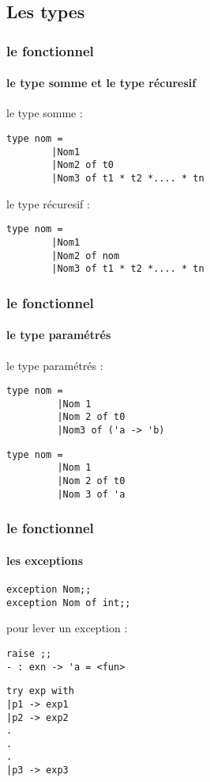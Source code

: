       \subsection{Les types}
\begin{frame}[fragile]
	\frametitle{le fonctionnel}
	\framesubtitle{le type somme et le type récuresif}
	le type somme :
	\begin{lstlisting}
type nom =
        |Nom1 
        |Nom2 of t0 
        |Nom3 of t1 * t2 *.... * tn 
	\end{lstlisting}
	le type récuresif :
	\begin{lstlisting}
type nom =
        |Nom1
        |Nom2 of nom
        |Nom3 of t1 * t2 *.... * tn
         \end{lstlisting}
\end{frame}

\begin{frame}[fragile]
  \frametitle{le fonctionnel}
  \framesubtitle{le type paramétrés}
  le type paramétrés :
  \begin{lstlisting}
type nom =
         |Nom 1
         |Nom 2 of t0
         |Nom3 of ('a -> 'b)
  \end{lstlisting}
  \begin{lstlisting}
type nom = 
         |Nom 1 
         |Nom 2 of t0
         |Nom 3 of 'a 
  \end{lstlisting}
\end{frame}

\begin{frame}[fragile]
  \frametitle{le fonctionnel}
  \framesubtitle{les exceptions}
  \begin{lstlisting}
exception Nom;;
exception Nom of int;;
  \end{lstlisting}
pour lever un exception : 
\begin{lstlisting}
raise ;;
- : exn -> 'a = <fun>
\end{lstlisting}
\begin{lstlisting}
try exp with 
|p1 -> exp1
|p2 -> exp2
.
.
.
|p3 -> exp3
\end{lstlisting}

\end{frame}
